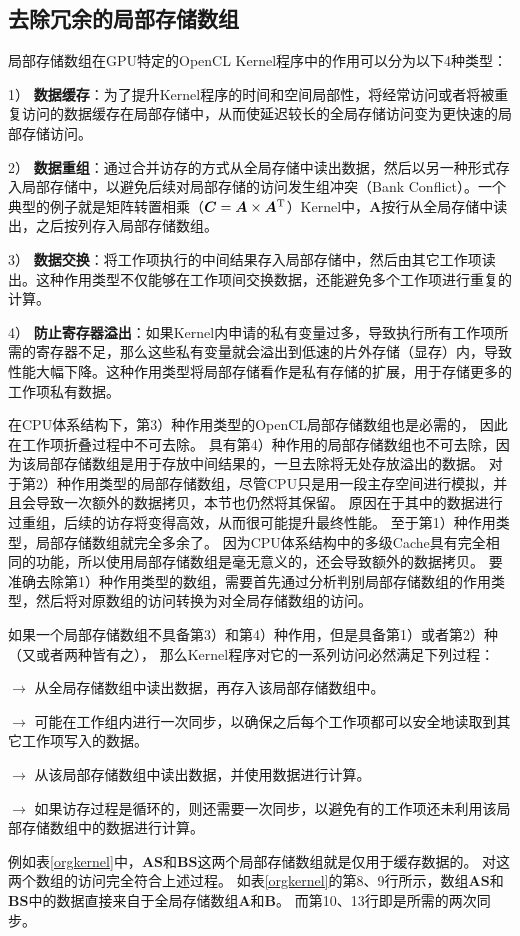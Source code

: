 \subsection{去除冗余的局部存储数组}
\label{localmemeliminatesec}
局部存储数组在GPU特定的OpenCL Kernel程序中的作用可以分为以下4种类型：
\begin{compactitem}
\item[1）]{\textbf{数据缓存}：为了提升Kernel程序的时间和空间局部性，将经常访问或者将被重复访问的数据缓存在局部存储中，从而使延迟较长的全局存储访问变为更快速的局部存储访问。}
\item[2）]{\textbf{数据重组}：通过合并访存的方式从全局存储中读出数据，然后以另一种形式存入局部存储中，以避免后续对局部存储的访问发生组冲突（Bank Conflict）。一个典型的例子就是矩阵转置相乘（$\bm{C} = \bm{A}\times \bm{A}^{\rm T}$）Kernel中，$\bm{A}$按行从全局存储中读出，之后按列存入局部存储数组。}
\item[3）]{\textbf{数据交换}：将工作项执行的中间结果存入局部存储中，然后由其它工作项读出。这种作用类型不仅能够在工作项间交换数据，还能避免多个工作项进行重复的计算。}
\item[4）]{\textbf{防止寄存器溢出}：如果Kernel内申请的私有变量过多，导致执行所有工作项所需的寄存器不足，那么这些私有变量就会溢出到低速的片外存储（显存）内，导致性能大幅下降。这种作用类型将局部存储看作是私有存储的扩展，用于存储更多的工作项私有数据。 }
\end{compactitem}

在CPU体系结构下，第3）种作用类型的OpenCL局部存储数组也是必需的，
因此在工作项折叠过程中不可去除。
具有第4）种作用的局部存储数组也不可去除，因为该局部存储数组是用于存放中间结果的，一旦去除将无处存放溢出的数据。
对于第2）种作用类型的局部存储数组，尽管CPU只是用一段主存空间进行模拟，并且会导致一次额外的数据拷贝，本节也仍然将其保留。
原因在于其中的数据进行过重组，后续的访存将变得高效，从而很可能提升最终性能。
至于第1）种作用类型，局部存储数组就完全多余了。
因为CPU体系结构中的多级Cache具有完全相同的功能，所以使用局部存储数组是毫无意义的，还会导致额外的数据拷贝。
要准确去除第1）种作用类型的数组，需要首先通过分析判别局部存储数组的作用类型，然后将对原数组的访问转换为对全局存储数组的访问。

如果一个局部存储数组不具备第3）和第4）种作用，但是具备第1）或者第2）种（又或者两种皆有之），
那么Kernel程序对它的一系列访问必然满足下列过程：
\begin{compactitem}
\item[$\rightarrow$]{从全局存储数组中读出数据，再存入该局部存储数组中。} 
\item[$\rightarrow$]{可能在工作组内进行一次同步，以确保之后每个工作项都可以安全地读取到其它工作项写入的数据。} 
\item[$\rightarrow$]{从该局部存储数组中读出数据，并使用数据进行计算。} 
\item[$\rightarrow$]{如果访存过程是循环的，则还需要一次同步，以避免有的工作项还未利用该局部存储数组中的数据进行计算。}
\end{compactitem}
例如表\ref{orgkernel}中，$\bm{AS}$和$\bm{BS}$这两个局部存储数组就是仅用于缓存数据的。
对这两个数组的访问完全符合上述过程。
如表\ref{orgkernel}的第8、9行所示，数组$\bm{AS}$和$\bm{BS}$中的数据直接来自于全局存储数组$\bm{A}$和$\bm{B}$。
而第10、13行即是所需的两次同步。

